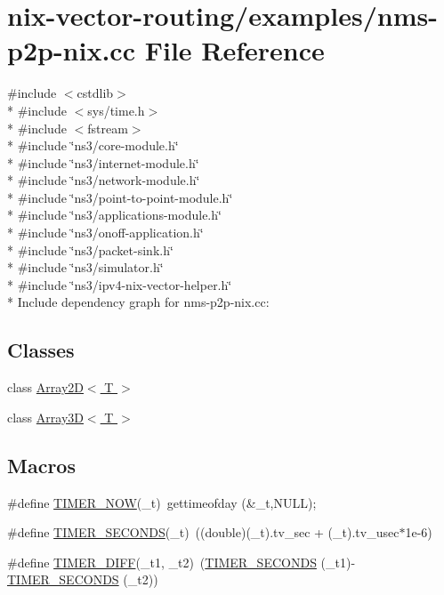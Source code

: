 \hypertarget{nms-p2p-nix_8cc}{}\section{nix-\/vector-\/routing/examples/nms-\/p2p-\/nix.cc File Reference}
\label{nms-p2p-nix_8cc}
{\ttfamily \#include $<$cstdlib$>$}\\*
{\ttfamily \#include $<$sys/time.\+h$>$}\\*
{\ttfamily \#include $<$fstream$>$}\\*
{\ttfamily \#include \char`\"{}ns3/core-\/module.\+h\char`\"{}}\\*
{\ttfamily \#include \char`\"{}ns3/internet-\/module.\+h\char`\"{}}\\*
{\ttfamily \#include \char`\"{}ns3/network-\/module.\+h\char`\"{}}\\*
{\ttfamily \#include \char`\"{}ns3/point-\/to-\/point-\/module.\+h\char`\"{}}\\*
{\ttfamily \#include \char`\"{}ns3/applications-\/module.\+h\char`\"{}}\\*
{\ttfamily \#include \char`\"{}ns3/onoff-\/application.\+h\char`\"{}}\\*
{\ttfamily \#include \char`\"{}ns3/packet-\/sink.\+h\char`\"{}}\\*
{\ttfamily \#include \char`\"{}ns3/simulator.\+h\char`\"{}}\\*
{\ttfamily \#include \char`\"{}ns3/ipv4-\/nix-\/vector-\/helper.\+h\char`\"{}}\\*
Include dependency graph for nms-\/p2p-\/nix.cc\+:
\subsection*{Classes}
\begin{DoxyCompactItemize}
\item 
class \hyperlink{classArray2D}{Array2\+D$<$ T $>$}
\item 
class \hyperlink{classArray3D}{Array3\+D$<$ T $>$}
\end{DoxyCompactItemize}
\subsection*{Macros}
\begin{DoxyCompactItemize}
\item 
\#define \hyperlink{nms-p2p-nix_8cc_a4ea1f7c69e863076962d247fee766870}{T\+I\+M\+E\+R\+\_\+\+N\+OW}(\+\_\+t)~gettimeofday (\&\+\_\+t,N\+U\+LL);
\item 
\#define \hyperlink{nms-p2p-nix_8cc_a6ea93eec918073a64885fa89d19e7b06}{T\+I\+M\+E\+R\+\_\+\+S\+E\+C\+O\+N\+DS}(\+\_\+t)~((double)(\+\_\+t).tv\+\_\+sec + (\+\_\+t).tv\+\_\+usec$\ast$1e-\/6)
\item 
\#define \hyperlink{nms-p2p-nix_8cc_ad474bed5f9f85ea66d5cf9a9648d4a72}{T\+I\+M\+E\+R\+\_\+\+D\+I\+FF}(\+\_\+t1,  \+\_\+t2)~(\hyperlink{nms-p2p-nix_8cc_a6ea93eec918073a64885fa89d19e7b06}{T\+I\+M\+E\+R\+\_\+\+S\+E\+C\+O\+N\+DS} (\+\_\+t1)-\/\hyperlink{nms-p2p-nix_8cc_a6ea93eec918073a64885fa89d19e7b06}{T\+I\+M\+E\+R\+\_\+\+S\+E\+C\+O\+N\+DS} (\+\_\+t2))
\end{DoxyCompactItemize}
